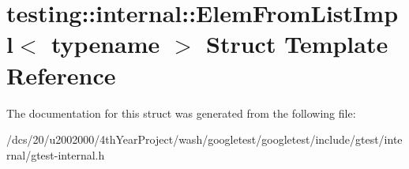\hypertarget{structtesting_1_1internal_1_1ElemFromListImpl}{}\section{testing\+:\+:internal\+:\+:Elem\+From\+List\+Impl$<$ typename $>$ Struct Template Reference}
\label{structtesting_1_1internal_1_1ElemFromListImpl}


The documentation for this struct was generated from the following file\+:\begin{DoxyCompactItemize}
\item 
/dcs/20/u2002000/4th\+Year\+Project/wash/googletest/googletest/include/gtest/internal/gtest-\/internal.\+h\end{DoxyCompactItemize}
